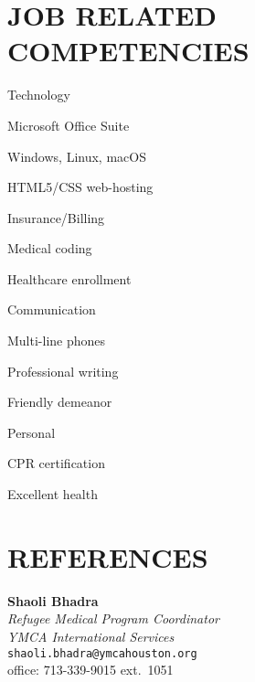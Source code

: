 \documentclass[margin]{res}
\newcommand\reference[5]{\textbf{#1}\\\emph{#2}\\#5\\#3\\}
\begin{document}
\begin{resume}
\section{JOB RELATED COMPETENCIES}\vspace{0pt}
	\begin{multicols}{2}
		\parskip=0pt
		\begin{skill}{Technology}
			\item Microsoft Office Suite
			\item Windows, Linux, macOS
			\item HTML5/CSS web-hosting
		\end{skill}
		\begin{skill}{Insurance/Billing}
			\item Medical coding
			\item Healthcare enrollment
		\end{skill}
		\begin{skill}{Communication}
			\item Multi-line phones
			\item Professional writing
			\item Friendly demeanor
		\end{skill}
		\begin{skill}{Personal}
			\item CPR certification
			\item Excellent health
		\end{skill}
	\end{multicols}
\newpage
\section{REFERENCES} 
		\reference{Shaoli Bhadra}{Refugee Medical Program Coordinator\\YMCA International Services}{office: 713-339-9015 ext.\ 1051}{cell: 704-651-3610}{\texttt{shaoli.bhadra@ymcahouston.org}}
		\parskip=0pt


\end{resume}
\end{document}
